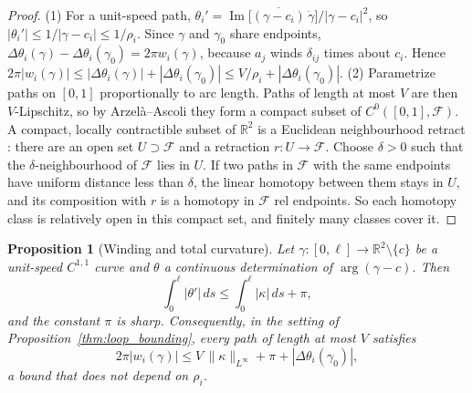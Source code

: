 \documentclass[11pt,reqno]{amsart}
\newtheorem{proposition}[theorem]{Proposition}
\theoremstyle{definition}
\providecommand{\R}{\mathbb{R}}
\numberwithin{equation}{section}
\providecommand{\R}{\mathbb{R}}
\begin{document}
\begin{proof}
(1) For a unit-speed path, $\theta_i' = \operatorname{Im}\big[\overline{(\gamma - c_i)}\,\dot\gamma\big]/|\gamma - c_i|^2$, so $|\theta_i'| \le 1/|\gamma - c_i| \le 1/\rho_i$. Since $\gamma$ and $\gamma_0$ share endpoints, $\Delta\theta_i(\gamma) - \Delta\theta_i(\gamma_0) = 2\pi w_i(\gamma)$, because $a_j$ winds $\delta_{ij}$ times about $c_i$. Hence $2\pi|w_i(\gamma)| \le |\Delta\theta_i(\gamma)| + |\Delta\theta_i(\gamma_0)| \le V/\rho_i + |\Delta\theta_i(\gamma_0)|$.
(2) Parametrize paths on $[0,1]$ proportionally to arc length. Paths of length at most $V$ are then $V$-Lipschitz, so by Arzel\`a--Ascoli they form a compact subset of $C^0([0,1], \mathcal{F})$. A compact, locally contractible subset of $\R^2$ is a Euclidean neighbourhood retract \cite[Appendix]{hatcher2002}: there are an open set $U \supset \mathcal{F}$ and a retraction $r \colon U \to \mathcal{F}$. Choose $\delta > 0$ such that the $\delta$-neighbourhood of $\mathcal{F}$ lies in $U$. If two paths in $\mathcal{F}$ with the same endpoints have uniform distance less than $\delta$, the linear homotopy between them stays in $U$, and its composition with $r$ is a homotopy in $\mathcal{F}$ rel endpoints. So each homotopy class is relatively open in this compact set, and finitely many classes cover it.
\end{proof}

\begin{proposition}[Winding and total curvature]
\label{prop:winding_total_curvature}
Let $\gamma \colon [0,\ell] \to \R^2 \setminus \{c\}$ be a unit-speed $C^{1,1}$ curve and $\theta$ a continuous determination of $\arg(\gamma - c)$. Then
\begin{equation}
\int_0^\ell |\theta'|\,ds \le \int_0^\ell |\kappa|\,ds + \pi,
\end{equation}
and the constant $\pi$ is sharp. Consequently, in the setting of Proposition~\ref{thm:loop_bounding}, every path of length at most $V$ satisfies
\begin{equation}
2\pi|w_i(\gamma)| \le V\,\|\kappa\|_{L^\infty} + \pi + |\Delta\theta_i(\gamma_0)|,
\end{equation}
a bound that does not depend on $\rho_i$.
\end{proposition}
\end{document}
